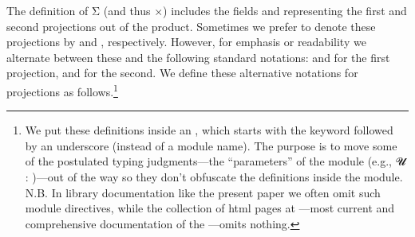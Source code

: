 The definition of \ar Σ (and thus \af ×) includes the fields   and  representing the first and second projections out of the product.  Sometimes we prefer to denote these projections by  and , respectively. However, for emphasis or readability we alternate between these and the following standard notations:  and  for the first projection,  and  for the second.  We define these alternative notations for projections as follows.\footnote{We put these definitions inside an , which starts with the  keyword followed by an underscore (instead of a module name). The purpose is to move some of the postulated typing judgments---the ``parameters'' of the module (e.g., \ab 𝓤 \as : )---out of the way so they don't obfuscate the definitions inside the module. N.B. In library documentation like the present paper we often omit such module directives, while the collection of html pages at \ualibdotorg---most current and comprehensive documentation of the \ualib---omits nothing.}
\ccpad
